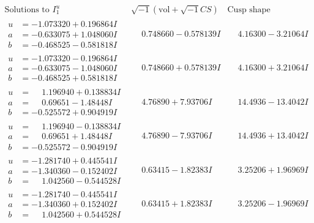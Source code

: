 \documentclass[1p]{elsarticle_modified}
\theoremstyle{definition}
\newcommand{\I}{\sqrt{-1}}
\begin{document}
$$\begin{array}{c|c|c}  
\text{Solutions to }I^u_{1}& \I (\text{vol} + \sqrt{-1}CS) & \text{Cusp shape}\\
 \hline 
\begin{aligned}
u &= -1.073320 + 0.196864 I \\
a &= -0.633075 + 1.048060 I \\
b &= -0.468525 - 0.581818 I\end{aligned}
 & \phantom{-}0.748660 - 0.578139 I & \phantom{-}4.16300 - 3.21064 I \\ \hline\begin{aligned}
u &= -1.073320 - 0.196864 I \\
a &= -0.633075 - 1.048060 I \\
b &= -0.468525 + 0.581818 I\end{aligned}
 & \phantom{-}0.748660 + 0.578139 I & \phantom{-}4.16300 + 3.21064 I \\ \hline\begin{aligned}
u &= \phantom{-}1.196940 + 0.138834 I \\
a &= \phantom{-}0.69651 - 1.48448 I \\
b &= -0.525572 + 0.904919 I\end{aligned}
 & \phantom{-}4.76890 + 7.93706 I & \phantom{-}14.4936 - 13.4042 I \\ \hline\begin{aligned}
u &= \phantom{-}1.196940 - 0.138834 I \\
a &= \phantom{-}0.69651 + 1.48448 I \\
b &= -0.525572 - 0.904919 I\end{aligned}
 & \phantom{-}4.76890 - 7.93706 I & \phantom{-}14.4936 + 13.4042 I \\ \hline\begin{aligned}
u &= -1.281740 + 0.445541 I \\
a &= -1.340360 - 0.152402 I \\
b &= \phantom{-}1.042560 - 0.544528 I\end{aligned}
 & \phantom{-}0.63415 - 1.82383 I & \phantom{-}3.25206 + 1.96969 I \\ \hline\begin{aligned}
u &= -1.281740 - 0.445541 I \\
a &= -1.340360 + 0.152402 I \\
b &= \phantom{-}1.042560 + 0.544528 I\end{aligned}
 & \phantom{-}0.63415 + 1.82383 I & \phantom{-}3.25206 - 1.96969 I \\ \hline\begin{aligned}

\end{aligned}
\end{array}$$
\end{document}
